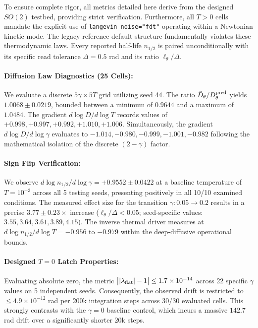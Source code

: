 \documentclass{article}
\begin{document}
To ensure complete rigor, all metrics detailed here derive from the designed $SO(2)$ testbed, providing strict verification. Furthermore, all $T>0$ cells mandate the explicit use of \texttt{langevin\_noise="fdt"} operating within a Newtonian kinetic mode. The legacy reference default structure fundamentally violates these thermodynamic laws. Every reported half-life $n_{1/2}$ is paired unconditionally with its specific read tolerance $\Delta=0.5$ rad and its ratio $\ell_\theta/\Delta$.

\paragraph{Diffusion Law Diagnostics (25 Cells):} We evaluate a discrete $5\gamma\times5T$ grid utilizing seed 44. The ratio $\hat D_\theta/D_\theta^{\rm pred}$ yields $1.0068\pm0.0219$, bounded between a minimum of $0.9644$ and a maximum of $1.0484$. The gradient $d\log D/d\log T$ records values of $+0.998,+0.997,+0.992,+1.010,+1.006$. Simultaneously, the gradient $d\log D/d\log\gamma$ evaluates to $-1.014,-0.980,-0.999,-1.001,-0.982$ following the mathematical isolation of the discrete $(2-\gamma)$ factor.

\paragraph{Sign Flip Verification:} We observe $d\log n_{1/2}/d\log\gamma=+0.9552\pm0.0422$ at a baseline temperature of $T=10^{-3}$ across all 5 testing seeds, presenting positively in all 10/10 examined conditions. The measured effect size for the transition $\gamma:0.05\to0.2$ results in a precise $3.77\pm0.23\times$ increase ($\ell_\theta/\Delta<0.05$; seed-specific values: $3.55,3.64,3.61,3.89,4.15$). The inverse thermal driver measures at $d\log n_{1/2}/d\log T=-0.956$ to $-0.979$ within the deep-diffusive operational bounds.

\paragraph{Designed $T=0$ Latch Properties:} Evaluating absolute zero, the metric $\big||\lambda_{\rm flat}|-1\big|\le1.7\times10^{-14}$ across 22 specific $\gamma$ values on 5 independent seeds. Consequently, the observed drift is restricted to $\le4.9\times10^{-12}$ rad per 200k integration steps across 30/30 evaluated cells. This strongly contrasts with the $\gamma=0$ baseline control, which incurs a massive $142.7$ rad drift over a significantly shorter 20k steps.
\end{document}
